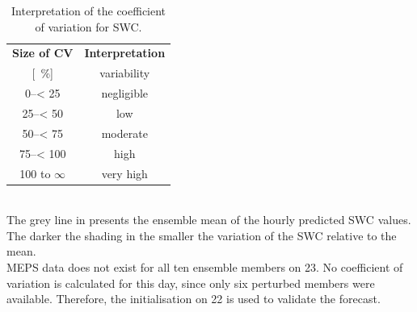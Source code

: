 \begin{table}[t!]
	\begin{center}
		\caption{Interpretation of the coefficient of variation for SWC.} \label{tab:verification}
		\begin{tabular}{lc|c}
			\hline\hline
			\multicolumn{2}{c|}{\textbf{Size of CV}} & {\textbf{Interpretation}} \\ 
			\multicolumn{2}{c|}{[\SI{}{\percent}]} & variability \\ \hline \hline 
			\multicolumn{2}{c|}{\numrange{0}{< 25}} & negligible  \\ \hline
			\multicolumn{2}{c|}{\numrange{25}{< 50}} & low \\ \hline
			\multicolumn{2}{c|}{\numrange{50}{< 75}} & moderate \\ \hline
			\multicolumn{2}{c|}{\numrange{75}{< 100}} & high \\ \hline
			\multicolumn{2}{c|}{\num{100} to $\infty$} & very high  \\ \hline \hline
		\end{tabular}
	\end{center}
\end{table}
\noindent
\\
The grey line in  presents the ensemble mean of the hourly predicted SWC values. The darker the shading in  the smaller the variation of the SWC relative to the mean. 
\\
MEPS data does not exist for all ten ensemble members on \SI{23}{\dec}. No coefficient of variation is calculated for this day, since only six perturbed members were available. Therefore, the initialisation on \SI{22}{\dec} is used to validate the forecast. 
